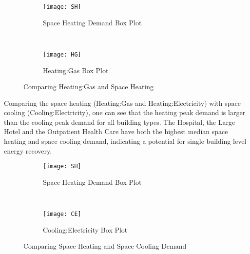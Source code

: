 \begin{figure}[h!]
  \centering
  \begin{subfigure}{0.4\textwidth}
  \centering
  \texttt{[image: SH]}
  \caption[Space Heating Demand Box Plot]{Space Heating Demand Box
    Plot}
  \label{fig:SH}
\end{subfigure}
~
\begin{subfigure}{0.4\textwidth}
  \centering
  \texttt{[image: HG]}
  \caption[Heating:Gas Box Plot]{Heating:Gas Box Plot}
  \label{fig:HG2}
\end{subfigure}
\caption[Comparing Heating:Gas and Space Heating]{Comparing
  Heating:Gas and Space Heating}
\end{figure}

Comparing the space heating (Heating:Gas and Heating:Electricity) with
space cooling (Cooling:Electricity), one can see that the heating peak
demand is larger than the cooling peak demand for all building
types. The Hospital, the Large Hotel and the Outpatient Health Care
have both the highest median space heating and space cooling demand,
indicating a potential for single building level energy recovery.
\begin{figure}[h!]
  \centering
  \begin{subfigure}{0.4\textwidth}
  \centering
  \texttt{[image: SH]}
  \caption[Space Heating Demand Box Plot]{Space Heating Demand Box
    Plot}
  \label{fig:SH}
\end{subfigure}
~
\begin{subfigure}{0.4\textwidth}
  \centering
  \texttt{[image: CE]}
  \caption[Cooling:Electricity Box Plot]{Cooling:Electricity Box Plot}
  \label{fig:CE2}
\end{subfigure}
\caption[Comparing Space Heating and Space Cooling Demand]{Comparing
  Space Heating and Space Cooling Demand}
\end{figure}

